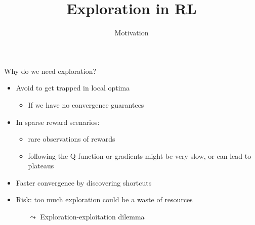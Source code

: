 


\title[RL: Exploration]{Exploration in RL}
\subtitle{Motivation}




	
	\maketitle

\begin{frame}[c]{Why do we need exploration?}

\begin{itemize}
	\item Avoid to get trapped in local optima 
	\begin{itemize}
		\item If we have no convergence guarantees
	\end{itemize}
	\item In sparse reward scenarios:
	\begin{itemize}
		\item rare observations of rewards
		\item following the Q-function or gradients might be very slow, or can lead to plateaus 
	\end{itemize}
	\item Faster convergence by discovering shortcuts
	\bigskip
	\pause
	\item \alert{Risk:} too much exploration could be a waste of resources
	\begin{itemize}
		\item[$\leadsto$] Exploration-exploitation dilemma
	\end{itemize}
\end{itemize}

\end{frame}
